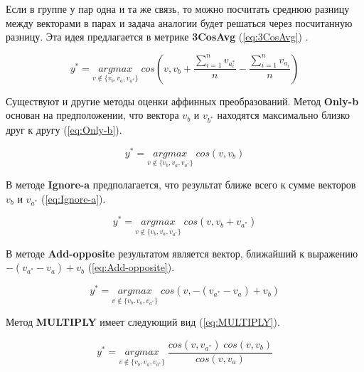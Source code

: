 \documentclass[a4paper,14pt]{article}
\begin{document}
	Если в группе у пар одна и та же связь, то можно посчитать среднюю разницу между векторами в парах и задача аналогии будет решаться через посчитанную разницу.
	Эта идея предлагается в метрике	\textbf{3CosAvg} (\ref{eq:3CosAvg}) \cite{28}.
	
	\begin{equation}
		y^* = \underset{v \notin \{v_b, v_a, v_{a^*}\}}{argmax} \; cos(v,v_b + \dfrac{\sum_{i=1}^{n}v_{a_i^*}}{n} - \dfrac{\sum_{i=1}^{n}v_{a_i}}{n})
		\label{eq:3CosAvg}
	\end{equation}
	
	Существуют и другие методы оценки аффинных преобразований.
	Метод \textbf{Only-b} \cite{27} основан на предположении, что вектора $v_b$ и $v_{b^*}$ находятся максимально близко друг к другу (\ref{eq:Only-b}).
	
	\begin{equation}
		y^* = \underset{v \notin \{v_b, v_a, v_{a^*}\}}{argmax} \; cos(v, v_b)
		\label{eq:Only-b}
	\end{equation}

	В методе \textbf{Ignore-a} \cite{27} предполагается, что результат ближе всего к сумме векторов $v_b$ и $v_{a^*}$ (\ref{eq:Ignore-a}).
	
	\begin{equation}
		y^* = \underset{v \notin \{v_b, v_a, v_{a^*}\}}{argmax} \; cos(v, v_b + v_{a^*})
		\label{eq:Ignore-a}
	\end{equation}

	В методе \textbf{Add-opposite} \cite{27} результатом является вектор, ближайший к выражению $-(v_{a^*} - v_a) + v_b$ (\ref{eq:Add-opposite}).

	\begin{equation}
		y^* = \underset{v \notin \{v_b, v_a, v_{a^*}\}}{argmax} \; cos(v, -(v_{a^*} - v_a) + v_b)
		\label{eq:Add-opposite}
	\end{equation}

	Метод \textbf{MULTIPLY} \cite{27} имеет следующий вид (\ref{eq:MULTIPLY}).
	
	\begin{equation}
		y^* = \underset{v \notin \{v_b, v_a, v_{a^*}\}}{argmax} \; \dfrac{cos(v, v_{a^*}) \; cos(v, v_b)}{cos(v, v_a)}
		\label{eq:MULTIPLY}
	\end{equation}
	
	
\end{document}

